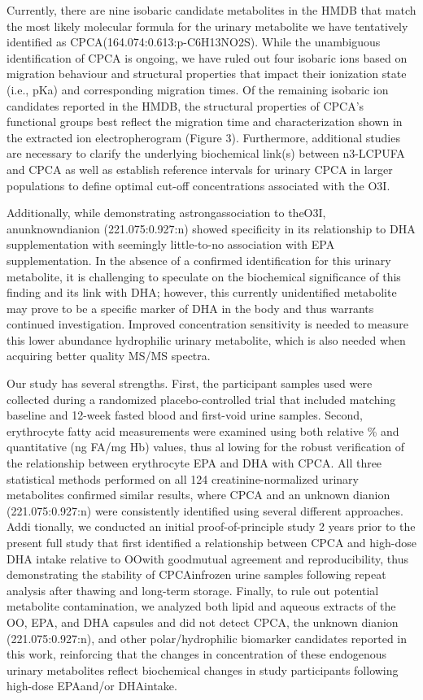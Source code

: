 \documentclass[journal=jacsat,manuscript=article]{achemso}
\begin{document}
Currently, there are nine isobaric candidate metabolites in the HMDB
that match the most likely molecular formula for the urinary metabolite
we have tentatively identified as CPCA(164.074:0.613:p-C6H13NO2S). While
the unambiguous identification of CPCA is ongoing, we have ruled out
four isobaric ions based on migration behaviour and structural
properties that impact their ionization state (i.e., pKa) and
corresponding migration times. Of the remaining isobaric ion candidates
reported in the HMDB, the structural properties of CPCA's functional
groups best reflect the migration time and characterization shown in the
extracted ion electropherogram (Figure 3). Furthermore, additional
studies are necessary to clarify the underlying biochemical link(s)
between n3-LCPUFA and CPCA as well as establish reference intervals for
urinary CPCA in larger populations to define optimal cut-off
concentrations associated with the O3I.

Additionally, while demonstrating astrongassociation to theO3I,
anunknowndianion (221.075:0.927:n) showed specificity in its
relationship to DHA supplementation with seemingly little-to-no
association with EPA supplementation. In the absence of a confirmed
identification for this urinary metabolite, it is challenging to
speculate on the biochemical significance of this finding and its link
with DHA; however, this currently unidentified metabolite may prove to
be a specific marker of DHA in the body and thus warrants continued
investigation. Improved concentration sensitivity is needed to measure
this lower abundance hydrophilic urinary metabolite, which is also
needed when acquiring better quality MS/MS spectra.

Our study has several strengths. First, the participant samples used
were collected during a randomized placebo-controlled trial that
included matching baseline and 12-week fasted blood and first-void urine
samples. Second, erythrocyte fatty acid measurements were examined using
both relative \% and quantitative (ng FA/mg Hb) values, thus al lowing
for the robust verification of the relationship between erythrocyte EPA
and DHA with CPCA. All three statistical methods performed on all 124
creatinine-normalized urinary metabolites confirmed similar results,
where CPCA and an unknown dianion (221.075:0.927:n) were consistently
identified using several different approaches. Addi tionally, we
conducted an initial proof-of-principle study 2 years prior to the
present full study that first identified a relationship between CPCA and
high-dose DHA intake relative to OOwith goodmutual agreement and
reproducibility, thus demonstrating the stability of CPCAinfrozen urine
samples following repeat analysis after thawing and long-term storage.
Finally, to rule out potential metabolite contamination, we analyzed
both lipid and aqueous extracts of the OO, EPA, and DHA capsules and did
not detect CPCA, the unknown dianion (221.075:0.927:n), and other
polar/hydrophilic biomarker candidates reported in this work,
reinforcing that the changes in concentration of these endogenous
urinary metabolites reflect biochemical changes in study participants
following high-dose EPAand/or DHAintake.
\end{document}

